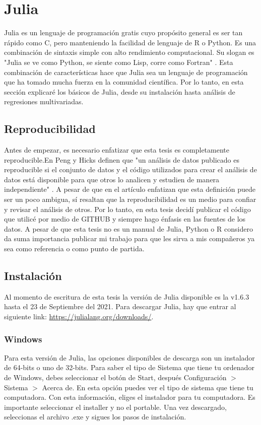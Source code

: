 \chapter{Julia}

Julia es un lenguaje de programación gratis cuyo propósito general es ser tan rápido como C, pero manteniendo la facilidad de lenguaje de R o Python. Es una combinación de sintaxis simple con alto rendimiento computacional. Su slogan es "Julia se ve como Python, se siente como Lisp, corre como Fortran" \citep{Hackers}. 
Esta combinación de características hace que Julia sea un lenguaje de programación que ha tomado mucha fuerza en la comunidad científica. Por lo tanto, en esta sección explicaré los básicos de Julia, desde su instalación hasta análisis de regresiones multivariadas. 

\section{Reproducibilidad}
Antes de empezar, es necesario enfatizar que esta tesis es completamente reproducible.En Peng y Hicks definen que "un análisis de datos publicado es reproducible si el conjunto de datos y el código utilizados para crear el análisis de datos está disponible para que otros lo analicen y estudien de manera independiente" \cite{peng2021reproducible}. A pesar de que en el artículo enfatizan que esta definición puede ser un poco ambigua, sí resaltan que la reproducibilidad es un medio para confiar y revisar el análisis de otros. Por lo tanto, en esta tesis decidí publicar el código que utilicé por medio de GITHUB y siempre hago énfasis en las fuentes de los datos. A pesar de que esta tesis no es un manual de Julia, Python o R considero da suma importancia publicar mi trabajo para que les sirva a mis compañeros ya sea como referencia o como punto de partida. 


\section{Instalación}
Al momento de escritura de esta tesis la versión de Julia disponible es la v1.6.3 hasta el 23 de Septiembre del 2021. Para descargar Julia, hay que entrar al siguiente link: \url{https://julialang.org/downloads/}. 

\subsection{Windows}
Para esta versión de Julia, las opciones disponibles de descarga son un instalador de 64-bits o uno de 32-bits. Para saber el tipo de Sistema que tiene tu ordenador de Windows, debes seleccionar el botón de \textsf{Start}, después \textsf{Configuración} $>$ \textsf{Sistema} $>$ \textsf{Acerca de}. En esta opción puedes ver el tipo de sistema que tiene tu computadora. Con esta información, eliges el instalador para tu computadora. Es importante seleccionar el \textsf{installer} y no el \textsf{portable}. Una vez descargado, seleccionas el archivo \textsf{.exe} y sigues los pasos de instalación. 


